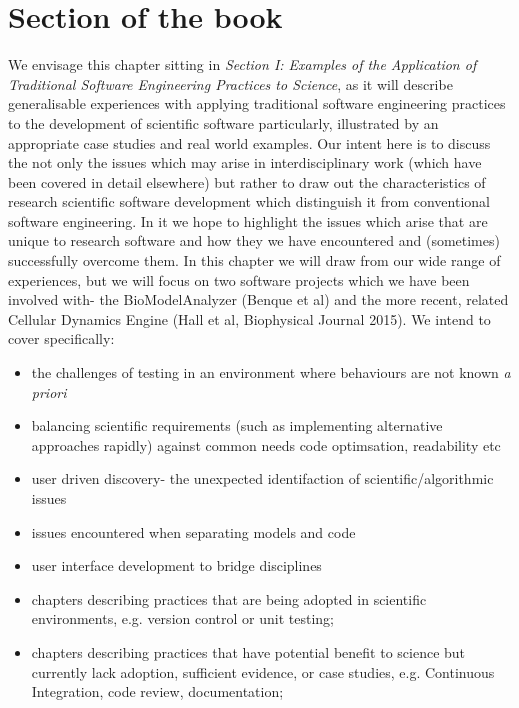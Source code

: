 \documentclass[a4paper,11pt]{article}
\begin{document}
\section*{Section of the book}

We envisage this chapter sitting in {\emph{Section I: Examples of the
Application of Traditional Software Engineering Practices to
Science}}, as it will describe generalisable experiences with applying
traditional software engineering practices to the development of
scientific software particularly, illustrated by an appropriate case
studies and real world examples. Our intent here is to discuss the 
not only the issues which may arise in interdisciplinary work (which
have been covered in detail elsewhere) but rather to draw out the
characteristics of research scientific software development which 
distinguish it from conventional software engineering. In it we hope
to highlight the issues which arise that are unique to research software
and how they we have encountered and (sometimes) successfully overcome 
them. In this chapter we will draw from our wide range of experiences, but
we will focus on two software projects which we have been involved with-
the BioModelAnalyzer (Benque et al) and the more recent, related Cellular 
Dynamics Engine (Hall et al, Biophysical Journal 2015). We intend to cover 
specifically:

\begin{itemize}
\item the challenges of testing in an environment where behaviours 
	are not known \emph{a priori}
\item balancing scientific requirements (such as implementing alternative 
	approaches rapidly) against common needs code optimsation, 
	readability etc
\item user driven discovery- the unexpected identifaction of 
	scientific/algorithmic issues
\item issues encountered when separating models and code
\item user interface development to bridge disciplines
\item chapters describing practices that are being adopted in
  scientific environments, e.g. version control or unit testing;
\item chapters describing practices that have potential benefit to
  science but currently lack adoption, sufficient evidence, or case
  studies, e.g. Continuous Integration, code review, documentation;
\end{itemize}
\end{document}
